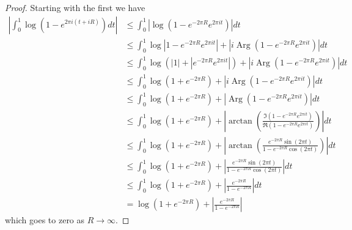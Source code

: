 \documentclass[10pt]{article}
\DeclareMathOperator{\Arg}{Arg}
\theoremstyle{remark}
\theoremstyle{remark}
\begin{document}
\begin{proof}
  Starting with the first we have
  \begin{align*}
    \left|\int_0^1\log(1-e^{2\pi i(t+iR)})dt\right| &\leq \int_0^1\left|\log(1-e^{-2\pi R}e^{2\pi i t})\right|dt\\
                                              &\leq\int_0^1\log|1-e^{-2\pi R}e^{2\pi i t}|+|i\Arg(1-e^{-2\pi R}e^{2\pi it})|dt\\
                                              & \leq\int_0^1\log(|1|+|e^{-2\pi R}e^{2\pi i t}|)+|i\Arg(1-e^{-2\pi R}e^{2\pi it})|dt\\
                                              &\leq\int_0^1\log(1+e^{-2\pi R})+|i\Arg(1-e^{-2\pi R}e^{2\pi it})|dt\\
                                              &\leq\int_0^1\log(1+e^{-2\pi R})+|\Arg(1-e^{-2\pi R}e^{2\pi it})|dt\\
                                              &\leq\int_0^1\log(1+e^{-2\pi R})+|\arctan(\frac{\Im(1-e^{-2\pi R}e^{2\pi it})}{\Re(1-e^{-2\pi R}e^{2\pi it})})|dt\\
                                              &\leq\int_0^1\log(1+e^{-2\pi R})+|\arctan(\frac{e^{-2\pi R}\sin(2\pi t)}{1-e^{-2\pi R}\cos(2\pi t)})|dt\\
                                              &\leq\int_0^1\log(1+e^{-2\pi R})+|\frac{e^{-2\pi R}\sin(2\pi t)}{1-e^{-2\pi R}\cos(2\pi t)}|dt\\
                                              &\leq\int_0^1\log(1+e^{-2\pi R})+|\frac{e^{-2\pi R}}{1-e^{-2\pi R}}|dt\\
                                              &= \log(1+e^{-2\pi R})+|\frac{e^{-2\pi R}}{1-e^{-2\pi R}}|
  \end{align*}
  which goes to zero as $R\rightarrow \infty$.


\end{proof}
\end{document}
